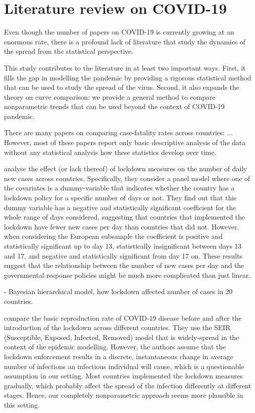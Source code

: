 \documentclass[a4paper,12pt]{article}
\numberwithin{equation}{section}
\begin{document}
{\color{red}
\section{Literature review on COVID-19}

Even though the number of papers on COVID-19 is currently growing at an enormous rate, there is a profound lack of literature that study the dynamics of the spread from the statistical perspective.

This study contributes to the literature in at least two important ways. First, it fills the gap in modelling the pandemic by providing a rigorous statistical method that can be used to study the spread of the virus. Second, it also expands the theory on curve comparison: we provide a general method to compare nonparametric trends that can be used beyond the context of COVID-19 pandemic.

There are many papers on comparing case-fatality rates across countries: \cite{Khafaie2020}... However, most of these papers report only basic descriptive analysis of the data without any statistical analysis how these statistics develop over time.

\cite{Alfano2020} analyse the effect (or lack thereof) of lockdown measures on the number of daily new cases across countries. Specifically, they consider a panel model where one of the covariates is a dummy-variable that indicates whether the country has a lockdown policy for a specific number of days or not. They find out that this dummy variable has a negative and statistically significant coefficient for the whole range of days considered, suggesting that countries that implemented the lockdown have fewer new cases per day than countries that did not. However, when considering the European subsample the coefficient is positive and statistically significant up to day 13, statistically insignificant between days 13 and 17, and negative and statistically significant from day 17 on. These results suggest that the relationship between the number of new cases per day and the governmental response policies might be much more complicated than just linear.


\cite{Banholzer2020} - Bayesian hierarchical model, how lockdown affected number of cases in 20 countries. 

\cite{deBrower2020} compare the basic reproduction rate of COVID-19 disease before and after the introduction of the lockdown across different countries. They use the SEIR (Susceptible, Exposed, Infected, Removed) model that is widely-spread in the context of the epidemic modelling. However, the authors assume that the lockdown enforcement results in a discrete, instantaneous change in average number of infections an infectious individual will cause, which is a questionable assumption in our setting. Most countries implemented the lockdown measures gradually, which probably affect the spread of the infection differently at different stages. Hence, our completely nonparametric approach seems more plausible in this setting.
}
\end{document}
